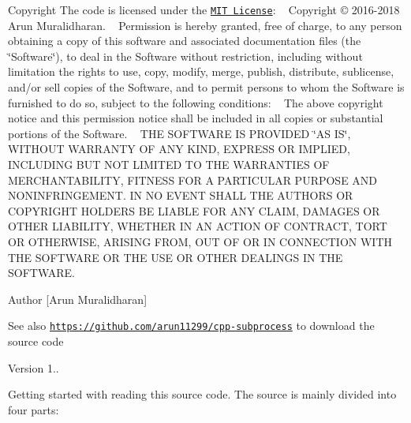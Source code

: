 \begin{DoxyCopyright}{Copyright}
The code is licensed under the \href{http://opensource.org/licenses/MIT}{\tt M\+IT License}\+: ~\newline
 Copyright \copyright{} 2016-\/2018 Arun Muralidharan. ~\newline
 Permission is hereby granted, free of charge, to any person obtaining a copy of this software and associated documentation files (the \char`\"{}\+Software\char`\"{}), to deal in the Software without restriction, including without limitation the rights to use, copy, modify, merge, publish, distribute, sublicense, and/or sell copies of the Software, and to permit persons to whom the Software is furnished to do so, subject to the following conditions\+: ~\newline
 The above copyright notice and this permission notice shall be included in all copies or substantial portions of the Software. ~\newline
 T\+HE S\+O\+F\+T\+W\+A\+RE IS P\+R\+O\+V\+I\+D\+ED \char`\"{}\+A\+S I\+S\char`\"{}, W\+I\+T\+H\+O\+UT W\+A\+R\+R\+A\+N\+TY OF A\+NY K\+I\+ND, E\+X\+P\+R\+E\+SS OR I\+M\+P\+L\+I\+ED, I\+N\+C\+L\+U\+D\+I\+NG B\+UT N\+OT L\+I\+M\+I\+T\+ED TO T\+HE W\+A\+R\+R\+A\+N\+T\+I\+ES OF M\+E\+R\+C\+H\+A\+N\+T\+A\+B\+I\+L\+I\+TY, F\+I\+T\+N\+E\+SS F\+OR A P\+A\+R\+T\+I\+C\+U\+L\+AR P\+U\+R\+P\+O\+SE A\+ND N\+O\+N\+I\+N\+F\+R\+I\+N\+G\+E\+M\+E\+NT. IN NO E\+V\+E\+NT S\+H\+A\+LL T\+HE A\+U\+T\+H\+O\+RS OR C\+O\+P\+Y\+R\+I\+G\+HT H\+O\+L\+D\+E\+RS BE L\+I\+A\+B\+LE F\+OR A\+NY C\+L\+A\+IM, D\+A\+M\+A\+G\+ES OR O\+T\+H\+ER L\+I\+A\+B\+I\+L\+I\+TY, W\+H\+E\+T\+H\+ER IN AN A\+C\+T\+I\+ON OF C\+O\+N\+T\+R\+A\+CT, T\+O\+RT OR O\+T\+H\+E\+R\+W\+I\+SE, A\+R\+I\+S\+I\+NG F\+R\+OM, O\+UT OF OR IN C\+O\+N\+N\+E\+C\+T\+I\+ON W\+I\+TH T\+HE S\+O\+F\+T\+W\+A\+RE OR T\+HE U\+SE OR O\+T\+H\+ER D\+E\+A\+L\+I\+N\+GS IN T\+HE S\+O\+F\+T\+W\+A\+RE.
\end{DoxyCopyright}
\begin{DoxyAuthor}{Author}
\mbox{[}Arun Muralidharan\mbox{]} 
\end{DoxyAuthor}
\begin{DoxySeeAlso}{See also}
\href{https://github.com/arun11299/cpp-subprocess}{\tt https\+://github.\+com/arun11299/cpp-\/subprocess} to download the source code
\end{DoxySeeAlso}
\begin{DoxyVersion}{Version}
1..
\end{DoxyVersion}
Getting started with reading this source code. The source is mainly divided into four parts\+:
